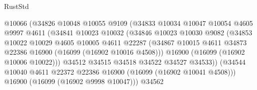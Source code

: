 \begin{lexlean}{RustStd}
\begin{coremodule}
                                    @10066
                                    (@34826
                                      @10048
                                      @10055
                                      @9109
                                      (@34833
                                        @10034
                                        @10047
                                        @10054
                                        @4605
                                        @9997
                                        @4611
                                        (@34841
                                          @10023
                                          @10032
                                          (@34846
                                            @10023
                                            @10030
                                            @9082
                                            (@34853
                                              @10022
                                              @10029
                                              @4605
                                              @10005
                                              @4611
                                              @22287
                                              (@34867
                                                @10015
                                                @4611
                                                @34873
                                                @22386
                                                @16900
                                                (@16099 (@16902 @10016 @4508)))
                                              @16900
                                              (@16099 (@16902 @10006 @10022)))
                                            @34512
                                            @34515
                                            @34518
                                            @34522
                                            @34527
                                            @34533))
                                        (@34544
                                          @10040
                                          @4611
                                          @22372
                                          @22386
                                          @16900
                                          (@16099 (@16902 @10041 @4508)))
                                        @16900
                                        (@16099 (@16902 @9998 @10047)))
                                      @34562

\end{coremodule}
\end{lexlean}

